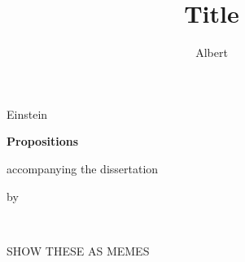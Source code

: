 \documentclass{dissertation}
\begin{document}
\title[Optional Subtitle]{Title}
\author{Albert}{Einstein}

\begin{center}

{\Large\titlefont\bfseries Propositions}

\bigskip

accompanying the dissertation

\bigskip

{\makeatletter
\titlestyle\bfseries\large\@title
\makeatother}

{\makeatletter
\ifx\@subtitle\undefined\else
    \titlefont\titleshape\@subtitle
\fi
\makeatother}

\bigskip

by

\bigskip

\makeatletter
{\large\titlefont\bfseries\@firstname\ {\titleshape\@lastname}}
\makeatother

\end{center}

\bigskip
\bigskip

SHOW THESE AS MEMES
\end{document}
